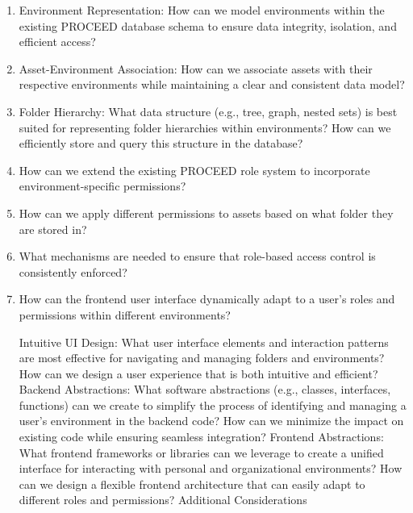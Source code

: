 \begin{enumerate}

\item Environment Representation: How can we model environments within the existing PROCEED database schema to ensure data integrity, isolation, and efficient access? 

\item Asset-Environment Association: How can we associate assets with their respective environments while maintaining a clear and consistent data model?

\item Folder Hierarchy: What data structure (e.g., tree, graph, nested sets) is best suited for representing folder hierarchies within environments? How can we efficiently store and query this structure in the database?


\item How can we extend the existing PROCEED role system to incorporate
environment-specific permissions? 

\item How can we apply different permissions to assets based on what folder they are
  stored in?

\item What mechanisms are needed to ensure that role-based access control is consistently enforced?

\item How can the frontend user interface dynamically adapt to a user's roles and permissions within different environments?


Intuitive UI Design: What user interface elements and interaction patterns are most effective for navigating and managing folders and environments? How can we design a user experience that is both intuitive and efficient?
Backend Abstractions: What software abstractions (e.g., classes, interfaces, functions) can we create to simplify the process of identifying and managing a user's environment in the backend code? How can we minimize the impact on existing code while ensuring seamless integration?
Frontend Abstractions: What frontend frameworks or libraries can we leverage to create a unified interface for interacting with personal and organizational environments? How can we design a flexible frontend architecture that can easily adapt to different roles and permissions?
Additional Considerations


\end{enumerate}
